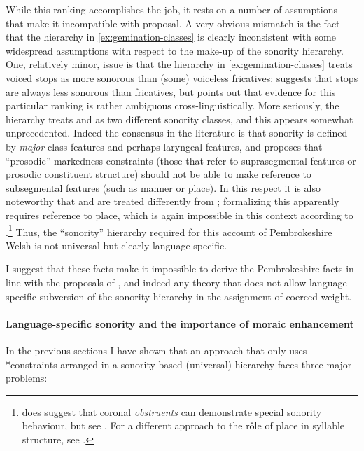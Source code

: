While this ranking accomplishes the job, it rests on a number of assumptions that make it incompatible with  proposal. A very obvious mismatch is the fact that the hierarchy in \ref{ex:gemination-classes} is clearly inconsistent with some widespread assumptions with respect to the make\hyp up of the sonority hierarchy. One, relatively minor, issue is that the hierarchy in \ref{ex:gemination-classes} treats voiced stops as more sonorous than (some) voiceless fricatives: \citet{delacy2006} suggests that stops are always less sonorous than fricatives, but \citet{parker11:_sonor} points out that evidence for this particular ranking is rather ambiguous cross\hyp linguistically. More seriously, the hierarchy treats \ipa{[f~θ~χ]} and \ipa{[s~ʃ~ɬ]} as two different sonority classes, and this appears somewhat unprecedented. Indeed the consensus in the literature is that sonority is defined by \emph{major} class features \citep{mccarthy88:_featur,clements90,rice92} and perhaps laryngeal features, and \citet{delacy2006} proposes that \enquote{prosodic} markedness constraints (\ie those that refer to suprasegmental features or prosodic constituent structure) should not be able to make reference to subsegmental features (such as manner or place). In this respect it is also noteworthy that \ipa{[m]} and \ipa{[ŋ]} are treated differently from \ipa{[n]}; formalizing this apparently requires reference to place, which is again impossible in this context according to \citet{delacy2006}.\footnote{\citet{steriade82:_greek} does suggest that coronal \emph{obstruents} can demonstrate special sonority behaviour, but see \eg \citet{clements90,rice92}. For a different approach to the rôle of place in syllable structure, see \citet{torre03:_dutch}.} Thus, the \enquote{sonority} hierarchy required for this account of Pembrokeshire Welsh is not universal but clearly language\hyp specific.

I suggest that these facts make it impossible to derive the Pembrokeshire facts in line with the proposals of \citet{delacy2006}, and indeed any theory that does not allow language\hyp specific subversion of the sonority hierarchy in the assignment of coerced weight.


\paragraph{Language\hyp specific sonority and the importance of moraic enhancement}
\label{sec:two-mora-appr}

In the previous sections I have shown that an approach that only uses *\mo[F] constraints arranged in a sonority\hyp based (universal) hierarchy faces three major problems:

